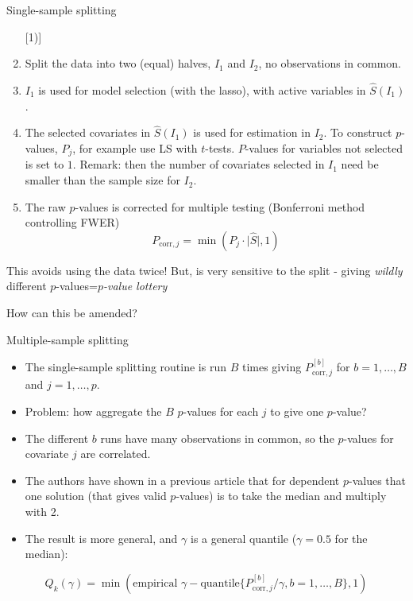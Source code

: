 \documentclass[
  ignorenonframetext,
]{beamer}
\providecommand{\tightlist}{%
  \setlength{\itemsep}{0pt}\setlength{\parskip}{0pt}}
\begin{document}
\begin{frame}

\begin{block}{Single-sample splitting}

\begin{enumerate}
[1)]
\tightlist
\item
  Split the data into two (equal) halves, \(I_1\) and \(I_2\), no
  observations in common.
\item
  \(I_1\) is used for model selection (with the lasso), with active
  variables in \(\hat{S}(I_1)\).
\item
  The selected covariates in \(\hat{S}(I_1)\) is used for estimation in
  \(I_2\). To construct \(p\)-values, \(P_j\), for example use LS with
  \(t\)-tests. \(P\)-values for variables not selected is set to \(1\).
  Remark: then the number of covariates selected in \(I_1\) need be
  smaller than the sample size for \(I_2\).
\item
  The raw \(p\)-values is corrected for multiple testing (Bonferroni
  method controlling FWER)
  \[ P_{\text{corr},j}=\min(P_j \cdot \lvert \hat{S} \rvert,1)\]
\end{enumerate}

This avoids using the data twice! But, is very sensitive to the split -
giving \emph{wildly} different \(p\)-values=\emph{\(p\)-value lottery}

How can this be amended?

\end{block}

\end{frame}

\begin{frame}

\begin{block}{Multiple-sample splitting}

\begin{itemize}
\item
  The single-sample splitting routine is run \(B\) times giving
  \(P_{\text{corr},j}^{[b]}\) for \(b=1,\ldots,B\) and \(j=1,\ldots,p\).
\item
  Problem: how aggregate the \(B\) \(p\)-values for each \(j\) to give
  one \(p\)-value?
\item
  The different \(b\) runs have many observations in common, so the
  \(p\)-values for covariate \(j\) are correlated.
\item
  The authors have shown in a previous article that for dependent
  \(p\)-values that one solution (that gives valid \(p\)-values) is to
  take the median and multiply with 2.
\item
  The result is more general, and \(\gamma\) is a general quantile
  (\(\gamma=0.5\) for the median):
\end{itemize}

\[Q_k(\gamma)=\min(\text{empirical }\gamma- \text{quantile} \{ P_{\text{corr},j}^{[b]}/\gamma,b=1,\ldots, B\},1)\]

\end{block}

\end{frame}
\end{document}
